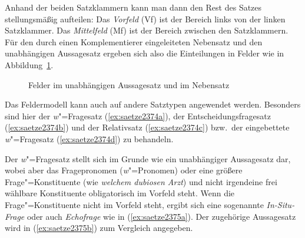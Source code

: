 Anhand der beiden Satzklammern kann man dann den Rest des Satzes stellungsmäßig aufteilen:
Das \textit{Vorfeld} (Vf) ist der Bereich links von der linken Satzklammer.
Das \textit{Mittelfeld} (Mf) ist der Bereich zwischen den Satzklammern.
Für den durch einen Komplementierer eingeleiteten Nebensatz und den unabhängigen Aussagesatz ergeben sich also die Einteilungen in Felder wie in Abbildung~\ref{fig:felder1}.

\begin{figure}[!htbp]
  \caption{Felder im unabhängigen Aussagesatz und im Nebensatz}
  \label{fig:felder1}
\end{figure}



Das Feldermodell kann auch auf andere Satztypen angewendet werden.
Besonders sind hier der \textit{w}"=Fragesatz (\ref{ex:saetze2374a}), der Entscheidungsfragesatz (\ref{ex:saetze2374b}) und der Relativsatz (\ref{ex:saetze2374c}) bzw.\ der eingebettete \textit{w}"=Fragesatz (\ref{ex:saetze2374d}) zu behandeln.

\begin{exe}
  \ex\label{ex:saetze2374} 
  \begin{xlist}
  \end{xlist}
\end{exe}

\label{abs:923478} Der \textit{w}"=Fragesatz stellt sich im Grunde wie ein unabhängiger Aussagesatz dar, wobei aber das Fragepronomen (\textit{w}"=Pronomen) oder eine größere Frage"=Konstituente (wie \textit{welchem dubiosen Arzt}) und nicht irgendeine frei wählbare Konstituente obligatorisch im Vorfeld steht.
Wenn die Frage"=Konstituente nicht im Vorfeld steht, ergibt sich eine sogenannte \textit{In-Situ-Frage} oder auch \textit{Echofrage} wie in (\ref{ex:saetze2375a}).
Der zugehörige Aussagesatz wird in (\ref{ex:saetze2375b}) zum Vergleich angegeben.


